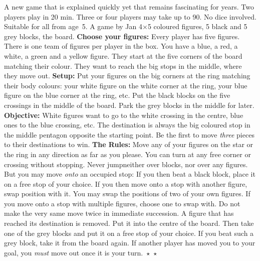 \shapepar{\starshape}
A new game that is explained quickly yet that 
remains 
fascinating for years. 
Two players play in 20 min. Three or four players
may take up to 90. 
No dice involved. Suitable for all  from
age~5. A game by Jan  
4$\times$5 coloured figures, 5 black and
5 grey blocks, the board.
\textsf{\textbf{Choose your figures: }}
Every player has five figures. There is one team of figures per player in the box. 
You have a blue, a red, a white, a green and a yellow figure. 
They start at the five corners of the board matching their colour.
They want to reach the big stops in the middle, where they move out.
\textsf{\textbf{Setup: } }
Put your figures on the big corners at the ring matching their body colours: 
your white figure on the white corner at the ring, your blue figure on the blue corner at the ring, etc.
Put the black blocks on the five crossings in the middle of the board. 
Park the grey blocks in the middle for later. 
\textsf{\textbf{Objective: }}
White figures want to go to the white crossing in the centre, blue
ones to the blue crossing, etc. The destination is always the big
coloured stop in the middle pentagon opposite the starting point.
Be the first to move \emph{three} pieces to their destinations to win.
\textsf{\textbf{The Rules: }}
Move any of your figures on the star or the ring in any direction as far as you please. 
You can turn at any free corner or crossing without stopping.
Never jump\textemdash neither over blocks, nor over any figures. 
But you may move \emph{onto} an occupied stop:
If you then beat a black block, place it on a free stop of your choice.
If you then move onto a stop with another figure, swap position with it.
You may swap the positions of two of your own figures. 
If you move onto a stop with multiple figures, choose one to swap with.
Do not make the very same move twice in immediate succession.  
A figure that has reached its destination is removed. Put it into the centre of the board. Then take one of the grey blocks and put it on a free stop of your choice.
If you beat such a grey block, take it from the board again.
If another player has  moved you to your goal, you \emph{must }move out once it is your turn.  $\!\!\star$   $\star$%